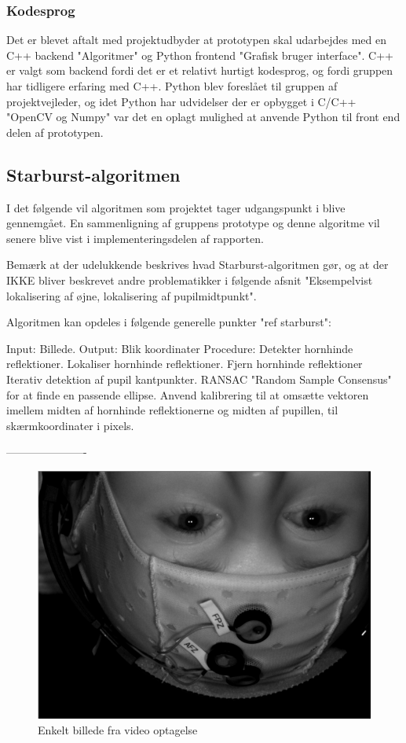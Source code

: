 \documentclass[rapport.tex]{subfiles}
\begin{document}
	
	
	\subsubsection{Kodesprog}
	Det er blevet aftalt med projektudbyder at prototypen skal udarbejdes med en C++ backend "Algoritmer" og Python frontend "Grafisk bruger interface".
	C++ er valgt som backend fordi det er et relativt hurtigt kodesprog, og fordi gruppen har tidligere erfaring
	med C++. Python blev foreslået til gruppen af projektvejleder, og idet Python har udvidelser der er opbygget
	i C/C++ "OpenCV og Numpy" var det en oplagt mulighed at anvende Python til front end delen af prototypen.
	                           
	\subsection{Starburst-algoritmen}
	I det følgende vil algoritmen som projektet tager udgangspunkt i blive gennemgået. En sammenligning af gruppens prototype og denne algoritme vil
	senere blive vist i implementeringsdelen af rapporten.
	
	Bemærk at der udelukkende beskrives hvad Starburst-algoritmen gør, og at der IKKE bliver beskrevet andre problematikker i følgende afsnit "Eksempelvist lokalisering af øjne, lokalisering af pupilmidtpunkt".
	
	Algoritmen kan opdeles i følgende generelle punkter "ref starburst":
	
	Input: Billede.
	Output: Blik koordinater
	Procedure:
	Detekter hornhinde reflektioner.
	Lokaliser hornhinde reflektioner.
	Fjern hornhinde reflektioner
	Iterativ detektion af pupil kantpunkter.
	RANSAC "Random Sample Consensus" for at finde en passende ellipse.
	Anvend kalibrering til at omsætte vektoren imellem midten af hornhinde reflektionerne og midten af pupillen, til skærmkoordinater i pixels.
	
	----------------------
	
	\begin{figure}
	\centering
	\includegraphics[width=0.4\linewidth]{Billeder/InitialImage.png}
	\caption{Enkelt billede fra video optagelse}
	\label{fig:InitialImage}
	\end{figure}
	
\end{document}
